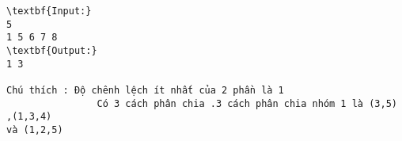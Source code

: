 \begin{verbatim}
\textbf{Input:}
5 
1 5 6 7 8
\textbf{Output:}
1 3

Chú thích : Độ chênh lệch ít nhất của 2 phần là 1
                Có 3 cách phân chia .3 cách phân chia nhóm 1 là (3,5) ,(1,3,4) 
và (1,2,5)

\end{verbatim}